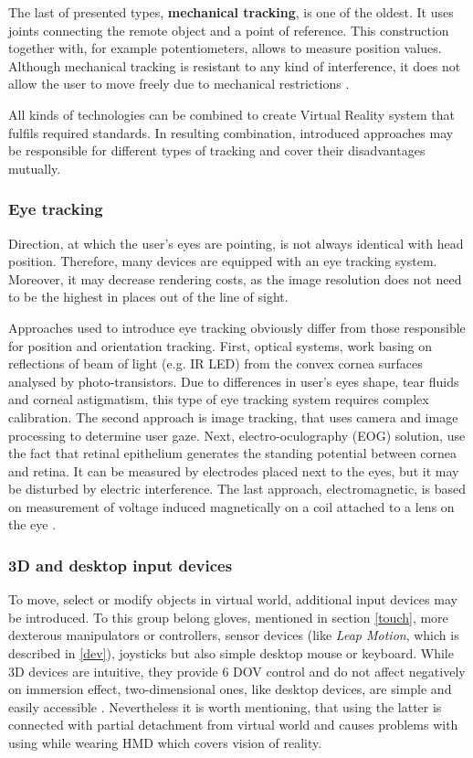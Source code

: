 The last of presented types, \textbf{mechanical tracking}, is one of the oldest. It uses joints connecting the remote object and a point of reference. This construction together with, for example potentiometers, allows to measure position values. Although mechanical tracking is resistant to any kind of interference, it does not allow the user to move freely due to mechanical restrictions \cite{Mazuryk96, Gobbetti99, Roadtovr14}.

All kinds of technologies can be combined to create Virtual Reality system that fulfils required standards. In resulting combination, introduced approaches may be responsible for different types of tracking and cover their disadvantages mutually.

\subsubsection{Eye tracking}\label{eyetracking}
Direction, at which the user's eyes are pointing, is not always identical with head position. Therefore, many devices are equipped with an eye tracking system. Moreover, it may decrease rendering costs, as the image resolution does not need to be the highest in places out of the line of sight. 

Approaches used to introduce eye tracking obviously differ from those responsible for position and orientation tracking. First, optical systems, work basing on reflections of beam of light (e.g. IR LED) from the convex cornea surfaces analysed by photo-transistors. Due to differences in user's eyes shape, tear fluids and corneal astigmatism, this type of eye tracking system  requires complex calibration. The second approach is image tracking, that uses camera and image processing to determine user gaze. Next, electro-oculography (EOG) solution, use the fact that retinal epithelium generates the standing potential between cornea and retina. It can be measured by electrodes placed next to the eyes, but it may be disturbed by electric interference. The last approach, electromagnetic, is based on measurement of voltage induced magnetically on a coil attached to a lens on the eye \cite{Mazuryk96, Gobbetti99}.
\subsubsection{3D and desktop input devices}
To move, select or modify objects in virtual world, additional input devices may be introduced. To this group belong gloves, mentioned in section \ref{touch}, more dexterous manipulators or controllers, sensor devices (like \textit{Leap Motion}, which is described in \ref{dev}), joysticks but also simple desktop mouse or keyboard. While 3D devices are intuitive, they provide 6 DOV control and do not affect negatively on immersion effect, two-dimensional ones, like desktop devices, are simple and easily accessible \cite{Mazuryk96}. Nevertheless it is worth mentioning, that using the latter is connected with partial detachment from virtual world and causes problems with using while wearing HMD which covers vision of reality.
